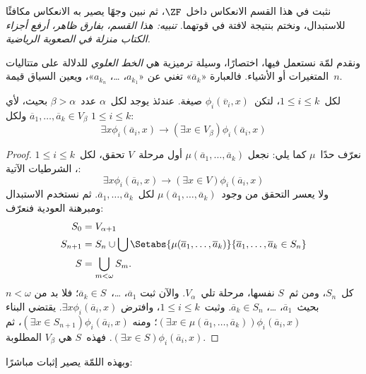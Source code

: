 \documentclass[../../../include/open-logic-section]{subfiles}
\begin{document}

نثبت في هذا القسم الانعكاس داخل~$\ZF$، ثم نبين وجهًا يصير به الانعكاس
مكافئًا للاستبدال، ونختم بنتيجة لافتة في قوتهما. \emph{تنبيه: هذا
القسم، بفارق ظاهر، أرفع أجزاء الكتاب منزلة في الصعوبة الرياضية.}

ونقدم لمّة نستعمل فيها، اختصارًا، وسيلة ترميزية هي \emph{الخط
العلوي} للدلالة على متتاليات المتغيرات أو الأشياء. فالعبارة
«$\overline{a}_k$» تغني عن «$a_{k_1}$، \dots، $a_{k_n}$»، ويعين
السياق قيمة~$n$.

\begin{lem}
لكل~$1 \leq i \leq k$، لتكن~$\phi_i(\overline{v}_i, x)$ صيغة. عندئذ
يوجد لكل~$\alpha$ عدد~$\beta > \alpha$ بحيث، لأي
$\overline{a}_1, \ldots, \overline{a}_k \in V_\beta$ ولكل
$1 \leq i \leq k$:
\[
	\exists x\phi_i(\overline{a}_i, x) \rightarrow (\exists x \in V_\beta) \phi_i(\overline{a}_i, x)
\]
\end{lem}

\begin{proof}
نعرّف حدًا~$\mu$ كما يلي: نجعل
$\mu(\overline{a}_1, \ldots, \overline{a}_k)$ أول مرحلة~$V$ تحقق،
لكل~$1 \leq i \leq k$، الشرطيات الآتية:
\[
\exists x\phi_i(\overline{a}_i, x) \rightarrow (\exists x \in V) \phi_i(\overline{a}_i, x)
\]
ولا يعسر التحقق من وجود~$\mu(\overline{a}_1, \ldots,
\overline{a}_k)$ لكل~$\overline{a}_1, \ldots, \overline{a}_k$.
ثم نستخدم الاستبدال ومبرهنة العودية فنعرّف:
\begin{align*}
	S_0 & = V_{\alpha+1}\\
	S_{n+1} & = S_n \cup \bigcup
	\Setabs{\mu(\overline{a}_1, \ldots, \overline{a}_k)}
	{\overline{a}_1, \ldots, \overline{a}_k \in S_n} \\
	S &= \bigcup_{m < \omega} S_m.
\end{align*}
كل~$S_n$، ومن ثم~$S$ نفسها، مرحلة تلي~$V_\alpha$. والآن ثبت
$\overline{a}_1$، \dots،~$\overline{a}_k \in S$؛ فلا بد من
$n < \omega$ بحيث~$\overline{a}_1$، \dots،
$\overline{a}_k \in S_n$. وثبت~$1 \leq i \leq k$، وافترض
$\exists x\phi_i(\overline{a}_i,x)$. يقتضي البناء
$(\exists x \in \mu(\overline{a}_1,
\ldots, \overline{a}_k))\phi_i(\overline{a}_i, x)$؛ ومنه
$(\exists x \in S_{n+1})\phi_i(\overline{a}_i, x)$، ثم
$(\exists x \in S)\phi_i(\overline{a}_i, x)$. فهذه~$S$ هي
$V_\beta$ المطلوبة.
\end{proof}
\noindent
وبهذه اللمّة يصير إثبات
 مباشرًا:
\end{document}
